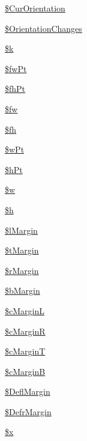 \begin{DoxyCompactItemize}
\item 
\hyperlink{classm_p_d_f_a09b90148400929d9125ab00049e3d5fa}{\$\-Cur\-Orientation}
\item 
\hyperlink{classm_p_d_f_a2406f25f327838ac43f73c83ac345157}{\$\-Orientation\-Changes}
\item 
\hyperlink{classm_p_d_f_a7255cff4df0e32943cfff1b5c0e50f77}{\$k}
\item 
\hyperlink{classm_p_d_f_af9342529683da62d782ddfc28e2b92b4}{\$fw\-Pt}
\item 
\hyperlink{classm_p_d_f_ad70548479d1aae66d9274fb1bef341e3}{\$fh\-Pt}
\item 
\hyperlink{classm_p_d_f_a569446aa8f5003d72abad323118c18b0}{\$fw}
\item 
\hyperlink{classm_p_d_f_a79fbe7491b99e8407ead32b17280c15e}{\$fh}
\item 
\hyperlink{classm_p_d_f_a0ab8fec70d0dbf7a92733831497f5fa4}{\$w\-Pt}
\item 
\hyperlink{classm_p_d_f_afdc888033e28d5153fd12bb7ac497e28}{\$h\-Pt}
\item 
\hyperlink{classm_p_d_f_aceefbb6ef8fd2dfaf307520d18d965f1}{\$w}
\item 
\hyperlink{classm_p_d_f_a6d9c7d34cc38ed78f7d469eae2ca77d7}{\$h}
\item 
\hyperlink{classm_p_d_f_abb7c52a1c7a22d62c248048f75ad719f}{\$l\-Margin}
\item 
\hyperlink{classm_p_d_f_a7244f3ce63bb21f63eb09b32e91d3081}{\$t\-Margin}
\item 
\hyperlink{classm_p_d_f_ad1dbc4ac9154e9d11a9178a5d539d288}{\$r\-Margin}
\item 
\hyperlink{classm_p_d_f_a4f9a5adc58516fb01a47ff60fe585a7a}{\$b\-Margin}
\item 
\hyperlink{classm_p_d_f_a129d3b9f1e6a9561d772c248d0ec2331}{\$c\-Margin\-L}
\item 
\hyperlink{classm_p_d_f_a5ab80bbda35ea69092e5f4df62a1ff6d}{\$c\-Margin\-R}
\item 
\hyperlink{classm_p_d_f_a66692bdd1a8e34b087189342f584bff1}{\$c\-Margin\-T}
\item 
\hyperlink{classm_p_d_f_a54e841b0df6f251c9dd1fb5e30593dea}{\$c\-Margin\-B}
\item 
\hyperlink{classm_p_d_f_a819ef96a3cfac488daed6c02a6173a1d}{\$\-Defl\-Margin}
\item 
\hyperlink{classm_p_d_f_a65d9a8a957651ef67b43ee98351384d3}{\$\-Defr\-Margin}
\item 
\hyperlink{classm_p_d_f_a36dec9628fe298cee82db1a3da362afe}{\$x}

\end{DoxyCompactItemize}

